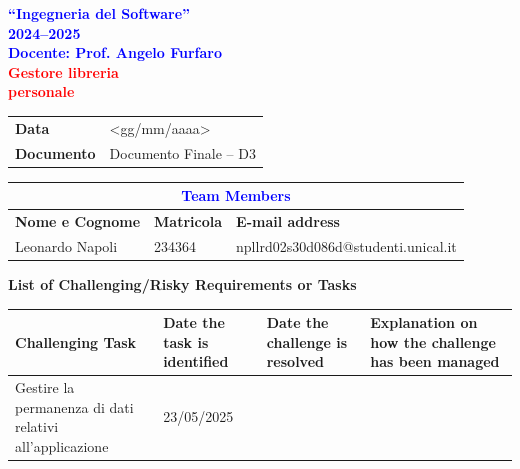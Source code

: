 


\begin{titlepage}
  \begin{center}
    \thispagestyle{title}
    \vspace*{1.5cm}

    \begin{center}
      {\LARGE \textbf{\textcolor{blue}{``Ingegneria del Software''}}}\\[0.3cm]
      {\LARGE \textbf{\textcolor{blue}{2024--2025}}}\\[1cm]
      {\normalsize \textbf{\textcolor{blue}{Docente: Prof. Angelo Furfaro}}}\\[1.2cm]
      {\Huge \textbf{\textcolor{red}{Gestore libreria}}}\\[0.3cm]
      {\Huge \textbf{\textcolor{red}{personale}}}
    \end{center}

    \vspace*{2.5cm}

    \noindent
    \begin{tabular}{|>{\bfseries}p{3cm}|p{12cm}|}
      \hline
      Data & <gg/mm/aaaa> \\
      Documento & Documento Finale -- D3 \\
      \hline
    \end{tabular}

    \vspace*{2.5cm}

    \begin{tabular}{|l|l|l|}
      \hline
      \multicolumn{3}{|c|}{\large \textbf{\textcolor{blue}{Team Members}}} \\
      \hline
      \textbf{Nome e Cognome} & \textbf{Matricola} & \textbf{E-mail address} \\
      \hline
      Leonardo Napoli & 234364 & npllrd02s30d086d@studenti.unical.it \\
      \hline
    \end{tabular}
  \end{center}
\end{titlepage}

\tableofcontents
\newpage
\pagestyle{plain}
{\Large \textbf{List of Challenging/Risky Requirements or Tasks}\label{list-of-challengingrisky-requirements-or-tasks}}

\begin{center}
  \begin{tabularx}{\textwidth}{|X|X|X|X|}
    \hline
    \textbf{Challenging Task}&
    \textbf{Date the task is identified}&
    \textbf{Date the challenge is resolved}&
    \textbf{Explanation on how the challenge has been managed}\\
    \hline
    Gestire la permanenza di dati relativi all'applicazione &
    23/05/2025 &
  \end{tabularx}
\end{center}

